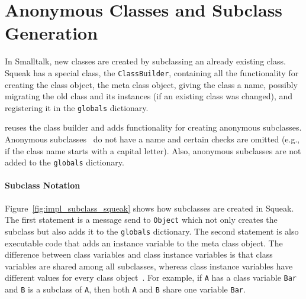 \section{Anonymous Classes and Subclass Generation}
\label{sec:impl_anon_subclass}
In Smalltalk, new classes are created by subclassing an already existing class. Squeak has a special class, the \texttt{ClassBuilder}, containing all the functionality for creating the class object, the meta class object, giving the class a name, possibly migrating the old class and its instances (if an existing class was changed), and registering it in the \texttt{globals} dictionary.

\msname reuses the class builder and adds functionality for creating anonymous subclasses. Anonymous subclasses~\cite{Ducasse99evaluatingmessage} do not have a name and certain checks are omitted (e.g., if the class name starts with a capital letter). Also, anonymous subclasses are not added to the \texttt{globals} dictionary.

\paragraph{Subclass Notation}
Figure~\ref{fig:impl_subclass_squeak} shows how subclasses are created in Squeak. The first statement is a message send to \texttt{Object} which not only creates the subclass but also adds it to the \texttt{globals} dictionary. The second statement is also executable code that adds an instance variable to the meta class object. The difference between class variables and class instance variables is that class variables are shared among all subclasses, whereas class instance variables have different values for every class object~\cite{classvar1,classvar2}. For example, if \texttt{A} has a class variable \texttt{Bar} and \texttt{B} is a subclass of \texttt{A}, then both \texttt{A} and \texttt{B} share one variable \texttt{Bar}.

